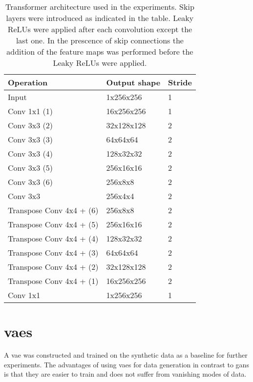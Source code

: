 \begin{table}[t]
    \centering
    \caption{Transformer architecture used in the experiments. Skip layers were introduced as indicated in the table. Leaky ReLUs were applied after each convolution except the last one. In the prescence of skip connections the addition of the feature maps was performed before the Leaky ReLUs were applied.}
    \label{tab:transformer}
    \begin{tabular}{|lll|}
        \hline
        Operation           & Output shape  & Stride \\ \hline
        Input               & 1x256x256     & 1     \\
        Conv 1x1 (1)           & 16x256x256    & 1     \\
        Conv 3x3 (2)            & 32x128x128    & 2     \\    
        Conv 3x3 (3)           & 64x64x64    & 2     \\ 
        Conv 3x3 (4)           & 128x32x32    & 2    \\ 
        Conv 3x3 (5)           & 256x16x16    & 2    \\ 
        Conv 3x3 (6)           & 256x8x8     & 2    \\ 
        Conv 3x3            & 256x4x4    & 2    \\ \hline
        Transpose Conv 4x4 + (6)  & 256x8x8    & 2    \\
        Transpose Conv 4x4 + (5) & 256x16x16    & 2    \\
        Transpose Conv 4x4 + (4) & 128x32x32    & 2    \\
        Transpose Conv 4x4 + (3) & 64x64x64    & 2    \\
        Transpose Conv 4x4 + (2) & 32x128x128    & 2    \\
        Transpose Conv 4x4 + (1)  & 16x256x256    & 2    \\
        Conv 1x1            & 1x256x256    & 1     \\ \hline
    \end{tabular}
\end{table}

\section{\acrlong{vaes}}
A \acrlong{vae} was constructed and trained on the synthetic data as a baseline for further experiments. The advantages of using \acrshort{vaes} for data generation in contrast to \acrshort{gans} is that they are easier to train and does not suffer from vanishing modes of data.

